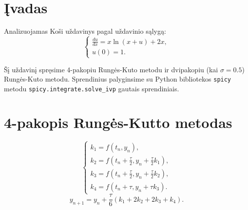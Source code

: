 \documentclass[]{VUMIFTemplateClass}
\begin{document}
\onehalfspacing


\tableofcontents
\onehalfspacing

\section{Įvadas}
Analizuojamas Koši uždavinys pagal uždavinio sąlygą:
\begin{equation}
    \begin{cases}
        \frac{du}{dx} = x \ln(x + u) + 2x,\\
        u(0) = 1.
    \end{cases}
\end{equation}

Šį uždavinį spręsime 4-pakopiu Rungės-Kuto metodu ir dvipakopiu (kai $\sigma = 0.5$) Rungės-Kuto metodu. Sprendinius palyginsime su Python bibliotekos \texttt{spicy} metodu \texttt{spicy.integrate.solve\_ivp} gautais sprendiniais.

\section{4-pakopis Rungės-Kutto metodas}
\begin{equation}
    \begin{cases}
        k_1 = f(t_n, y_n),\\
        k_2 = f(t_n + \frac{\tau}{2}, y_n + \frac{\tau}{2} k_1),\\
        k_3 = f(t_n + \frac{\tau}{2}, y_n + \frac{\tau}{2} k_2),\\
        k_4 = f(t_n + \tau, y_n + \tau k_3).
    \end{cases}
\end{equation}
\[ y_{n+1} = y_n + \frac{\tau}{6}(k_1 + 2k_2 + 2k_3 + k_4). \]

% 
% 
% 
% 
\end{document}

